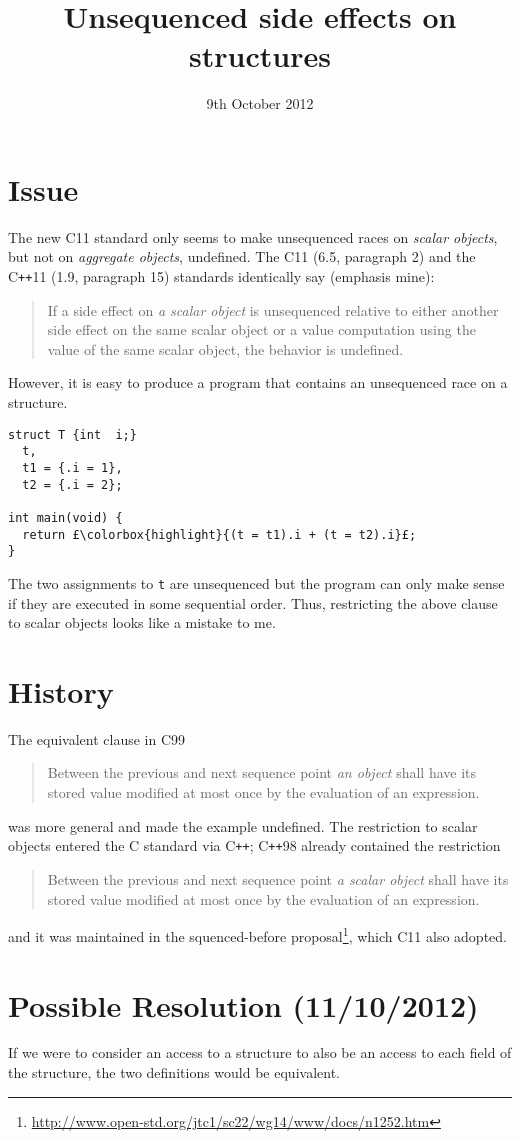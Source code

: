 \documentclass[a4paper,11pt]{article}
\title{Unsequenced side effects on structures}
\date{9th October 2012}
\begin{document}
\maketitle

\section{Issue}

The new C11 standard only seems to make unsequenced races on {\em
  scalar objects}, but not on {\em aggregate objects}, undefined. The
C11 (6.5, paragraph 2) and the C\lstinline{++}11 (1.9, paragraph 15)
standards identically say (emphasis mine):
\begin{quote}
  If a side effect on {\em a scalar object} is unsequenced relative to either
  another side effect on the same scalar object or a value computation using
  the value of the same scalar object, the behavior is undefined.
\end{quote}
However, it is easy to produce a program that contains an unsequenced race on a structure.
\begin{lstlisting}
struct T {int  i;}
  t,
  t1 = {.i = 1},
  t2 = {.i = 2};

int main(void) {
  return £\colorbox{highlight}{(t = t1).i + (t = t2).i}£;
}
\end{lstlisting}
The two assignments to \lstinline{t} are unsequenced but the program
can only make sense if they are executed in some sequential
order. Thus, restricting the above clause to scalar objects looks like
a mistake to me.

\section{History}
The equivalent clause in C99
\begin{quote}
  Between the previous and next sequence point {\em an object} shall have its
  stored value modified at most once by the evaluation of an expression.
\end{quote}
was more general and made the example undefined. The restriction to
scalar objects entered the C standard via C\lstinline{++};
C\lstinline{++}98 already contained the restriction
\begin{quote}
  Between the previous and next sequence point {\em a scalar object} shall
  have its stored value modified at most once by the evaluation of an
  expression.
\end{quote}
and it was maintained in the squenced-before
proposal\footnote{\url{http://www.open-std.org/jtc1/sc22/wg14/www/docs/n1252.htm}},
which C11 also adopted.

\section{Possible Resolution (11/10/2012)}
If we were to consider an access to a structure to also be an access to each
field of the structure, the two definitions would be equivalent.
\end{document}
